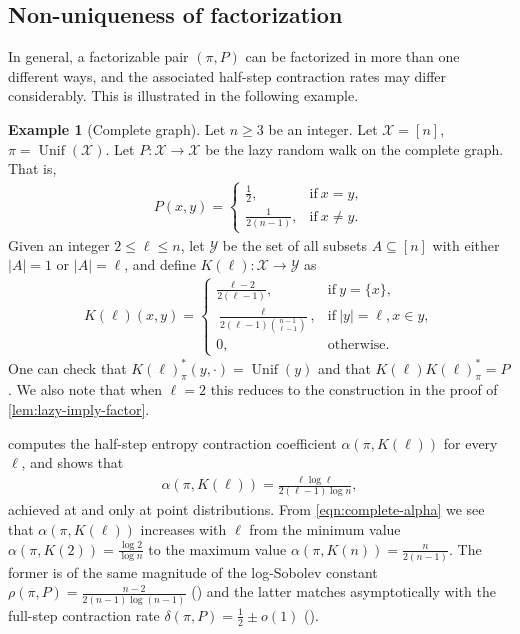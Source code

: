\documentclass[11pt]{article}
\def\cX{\mathcal{X}}
\def\cY{\mathcal{Y}}
\DeclareMathOperator\Unif{\mathrm{Unif}}
\theoremstyle{definition}
\newtheorem{example}[theorem]{Example}
\begin{document}
\subsection{Non-uniqueness of factorization}
In general, a factorizable pair $(\pi, P)$ can be factorized in more than one different ways, and the associated half-step contraction rates may differ considerably. This is illustrated in the following example.
\begin{example}[Complete graph] \label{ex:complete}
  Let $n\ge 3$ be an integer. Let $\cX = [n]$, $\pi = \Unif(\cX)$.
  Let $P: \cX \to \cX$ be the lazy random walk on the complete graph.
  That is,
  \begin{align}
    P(x,y) = \left\{
      \begin{array}{ll}
        \frac 12, & \text{if}~x=y,\\
        \frac 1{2(n-1)}, & \text{if}~x\ne y.
      \end{array}
    \right.
  \end{align}
  Given an integer $2\le \ell \le n$, let $\cY$ be the set of all subsets $A\subseteq [n]$ with either $|A|=1$ or $|A|=\ell$, and define $K(\ell): \cX \to \cY$ as
  \begin{align}
    K(\ell)(x,y) = \left\{
      \begin{array}{ll}
        \frac{\ell-2}{2(\ell-1)}, & \text{if}~y=\{x\},\\
        \frac{\ell}{2(\ell-1) \binom{n-1}{\ell-1}}, & \text{if}~|y|=\ell, x\in y,\\
        0, & \text{otherwise.}
      \end{array}
    \right.
  \end{align}
  One can check that $K(\ell)_\pi^*(y, \cdot) = \Unif(y)$ and that $K(\ell) K(\ell)_\pi^* = P$.
  We also note that when $\ell=2$ this reduces to the construction in the proof of \cref{lem:lazy-imply-factor}.

  \cite[Theorem 1.1]{bristiel2024entropy} computes the half-step entropy contraction coefficient $\alpha(\pi, K(\ell))$ for every $\ell$, and shows that
  \begin{align} \label{eqn:complete-alpha}
    \alpha(\pi, K(\ell)) = \frac{\ell \log \ell}{2(\ell-1) \log n},
  \end{align}
  achieved at and only at point distributions.
  From \cref{eqn:complete-alpha} we see that $\alpha(\pi, K(\ell))$ increases with $\ell$ from the minimum value $\alpha(\pi, K(2)) = \frac{\log 2}{\log n}$ to the maximum value $\alpha(\pi, K(n)) = \frac{n}{2(n-1)}$.
  The former is of the same magnitude of the log-Sobolev constant $\rho(\pi, P) = \frac{n-2}{2(n-1)\log(n-1)}$ (\cite[Corollary A.5]{diaconis1996logarithmic}) and the latter matches asymptotically with the full-step contraction rate $\delta(\pi, P) = \frac 12 \pm o(1)$ (\cite[Eq.~(131)]{gu2023non}).
\end{example}
\end{document}
